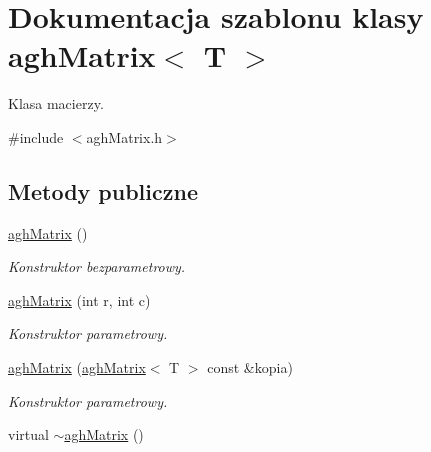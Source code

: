 \hypertarget{classaghMatrix}{\section{Dokumentacja szablonu klasy agh\-Matrix$<$ T $>$}
\label{classaghMatrix}
}


Klasa macierzy.  




{\ttfamily \#include $<$agh\-Matrix.\-h$>$}

\subsection*{Metody publiczne}
\begin{DoxyCompactItemize}
\item 
\hypertarget{classaghMatrix_a5f34eda3b8d3544718f8f1e71618c41a}{\hyperlink{classaghMatrix_a5f34eda3b8d3544718f8f1e71618c41a}{agh\-Matrix} ()}\label{classaghMatrix_a5f34eda3b8d3544718f8f1e71618c41a}

\begin{DoxyCompactList}\small\item\em Konstruktor bezparametrowy. \end{DoxyCompactList}\item 
\hyperlink{classaghMatrix_ae6997ec51eb966b039fa64e901b09e31}{agh\-Matrix} (int r, int c)
\begin{DoxyCompactList}\small\item\em Konstruktor parametrowy. \end{DoxyCompactList}\item 
\hyperlink{classaghMatrix_afef2f2c07892977a9f47651289363a4e}{agh\-Matrix} (\hyperlink{classaghMatrix}{agh\-Matrix}$<$ T $>$ const \&kopia)
\begin{DoxyCompactList}\small\item\em Konstruktor parametrowy. \end{DoxyCompactList}\item 
\hypertarget{classaghMatrix_aa79e149efcac75f3762a94b7a2b881cd}{virtual \hyperlink{classaghMatrix_aa79e149efcac75f3762a94b7a2b881cd}{$\sim$agh\-Matrix} ()}\label{classaghMatrix_aa79e149efcac75f3762a94b7a2b881cd}


\end{DoxyCompactItemize}
